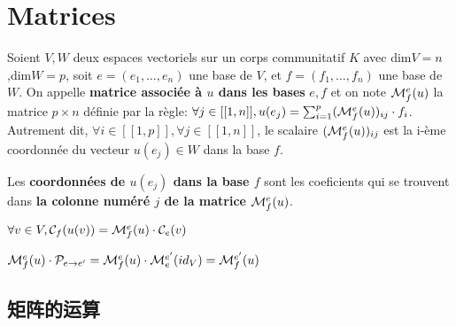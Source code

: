 \documentclass{article}
\begin{document}
\section{Matrices}
\begin{definition}
  Soient $V,W$ deux espaces vectoriels sur un corps communitatif $K$ avec dim$V=n$,dim$W=p$,\newline
  soit $e=(e_1,\ldots,e_n)$ une base de $V$, et $f=(f_1,\ldots,f_n)$ une base de $W$. \newline
  On appelle {\bf matrice associ\'ee \`a $u$ dans les bases} $e,f$ et on note ${\cal M}_f^e(u)$ la matrice $p \times n$ d\'efinie par la r\`egle:
  $\forall j \in [[1,n]], u(e_j)= \sum_{i=1}^p ({\cal M}_f^e(u))_{ij} \cdot f_i $. Autrement dit,
  $\forall i \in [[1,p]],\forall j \in [[1,n]]$, le scalaire $({\cal M}_f^e(u))_{ij}$ est la i-\`eme coordonn\'ee du vecteur $u(e_j) \in W $ dans la base $f$.
\end{definition}
\begin{note}
  Les {\bf coordonn\'ees de $u(e_j)$ dans la base $f$} sont les coeficients qui se trouvent dans {\bf la colonne num\'er\'e $j$ de la matrice}
  ${\cal M}_f^e(u)$.
\end{note}

\begin{theorem}
  $ \forall v \in V, {\cal C}_f(u(v))= {\cal M}_f^e(u)\cdot {\cal C}_e(v) $
\end{theorem}

\begin{note}
 $ {\cal M}_f^e(u)\cdot {\cal P}_{e\rightarrow e'}= {\cal M}_f^e(u)\cdot {\cal M}_e^{e'}(id_V)={\cal M}_f^{e'}(u)$
\end{note}

\subsection{矩阵的运算}
\end{document}
